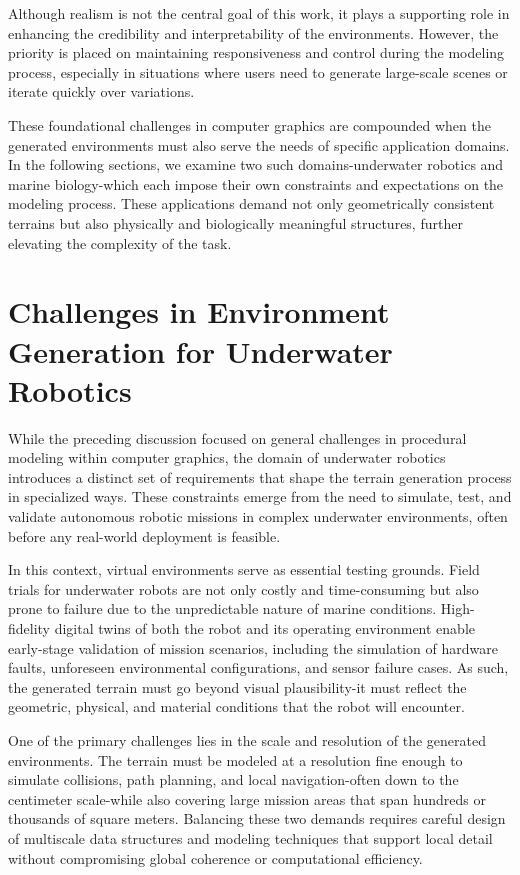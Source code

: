 Although realism is not the central goal of this work, it plays a supporting role in enhancing the credibility and interpretability of the environments. However, the priority is placed on maintaining responsiveness and control during the modeling process, especially in situations where users need to generate large-scale scenes or iterate quickly over variations.

These foundational challenges in computer graphics are compounded when the generated environments must also serve the needs of specific application domains. In the following sections, we examine two such domains-underwater robotics and marine biology-which each impose their own constraints and expectations on the modeling process. These applications demand not only geometrically consistent terrains but also physically and biologically meaningful structures, further elevating the complexity of the task.

\section{Challenges in Environment Generation for Underwater Robotics}

While the preceding discussion focused on general challenges in procedural modeling within computer graphics, the domain of underwater robotics introduces a distinct set of requirements that shape the terrain generation process in specialized ways. These constraints emerge from the need to simulate, test, and validate autonomous robotic missions in complex underwater environments, often before any real-world deployment is feasible.

In this context, virtual environments serve as essential testing grounds. Field trials for underwater robots are not only costly and time-consuming but also prone to failure due to the unpredictable nature of marine conditions. High-fidelity digital twins of both the robot and its operating environment enable early-stage validation of mission scenarios, including the simulation of hardware faults, unforeseen environmental configurations, and sensor failure cases. As such, the generated terrain must go beyond visual plausibility-it must reflect the geometric, physical, and material conditions that the robot will encounter.

One of the primary challenges lies in the scale and resolution of the generated environments. The terrain must be modeled at a resolution fine enough to simulate collisions, path planning, and local navigation-often down to the centimeter scale-while also covering large mission areas that span hundreds or thousands of square meters. Balancing these two demands requires careful design of multiscale data structures and modeling techniques that support local detail without compromising global coherence or computational efficiency.

